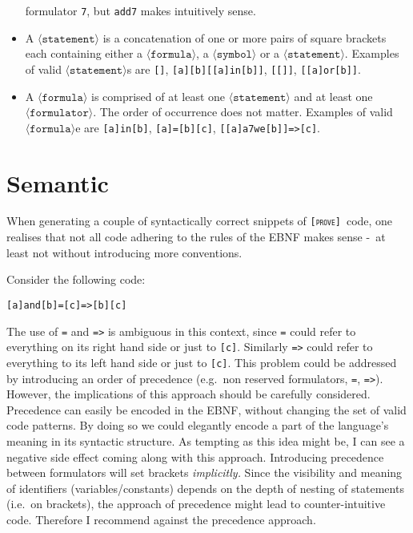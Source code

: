 \documentclass[british]{article}
\newcommand\prv{bc}
\newcommand\m[1]{\texttt{#1}}
\newcommand\name{\texttt{\textsc{[prove]}}}
\begin{document}
\begin{itemize}
		formulator \m{7}, but \m{add7} makes intuitively sense.
	\item
		A $\langle\texttt{statement}\rangle$ is a concatenation of one or more
		pairs of square brackets each containing either a
		$\langle\texttt{formula}\rangle$, a $\langle\texttt{symbol}\rangle$ or a
		$\langle\texttt{statement}\rangle$.  Examples of valid
		$\langle\texttt{statement}\rangle$s are \m{[]}, \m{[a][b][[a]in[b]]},
		\m{[[]]}, \m{[[a]or[b]]}.  \item A $\langle\texttt{formula}\rangle$ is
		comprised of at least one $\langle\texttt{statement}\rangle$ and at
		least one $\langle\texttt{formulator}\rangle$. The order of occurrence
		does not matter. Examples of valid $\langle\texttt{formula}\rangle$e are
		\m{[a]in[b]}, \m{[a]=[b][c]}, \m{[[a]a7we[b]]=>[c]}.
\end{itemize}

\section{Semantic}

When generating a couple of syntactically correct snippets of \name\
code, one realises that not all code adhering to the rules of the
EBNF makes sense -\ at least not without introducing more conventions.

\medskip{}

Consider the following code:

\begin{verbatim}
[a]and[b]=[c]=>[b][c]
\end{verbatim}

The use of \m{=} and \m{=>} is ambiguous in this context, since
\m{=} could refer to everything on its right hand side or just to
\m{[c]}. Similarly \m{=>} could refer to everything to its left
hand side or just to \m{[c]}. This problem could be addressed by
introducing an order of precedence (e.g.\ non reserved formulators,
\m{=}, \m{=>}). However, the implications of this approach should
be carefully considered. Precedence can easily be encoded in the EBNF,
without changing the set of valid code patterns. By doing so we could
elegantly encode a part of the language's meaning in its syntactic
structure. As tempting as this idea might be, I can see a negative
side effect coming along with this approach. Introducing precedence
between formulators will set brackets \textit{implicitly. }Since the
visibility and meaning of identifiers (variables/constants) depends
on the depth of nesting of statements (i.e.\ on brackets), the approach
of precedence might lead to counter-intuitive code. Therefore I recommend
against the precedence approach.
\end{document}
